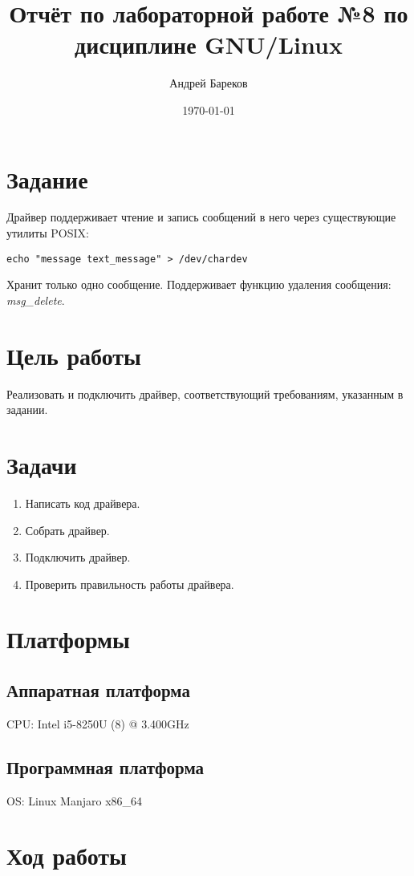 \documentclass[a4paper,11pt]{article}
\title{Отчёт по лабораторной работе №8 по дисциплине GNU/Linux}
\author{Андрей Бареков}
\date{\today}
\begin{document}
\maketitle
\newpage
\lstset{style=mycode}

\section{Задание}
  Драйвер поддерживает чтение и запись сообщений в него через существующие утилиты POSIX:
    \begin{lstlisting}
echo "message text_message" > /dev/chardev
    \end{lstlisting}
  Хранит только одно сообщение. Поддерживает функцию удаления сообщения: \textit{msg\_delete}.

\section{Цель работы}
  Реализовать и подключить драйвер, соответствующий требованиям, указанным в задании.

\section{Задачи}
  \begin{enumerate}
    \item Написать код драйвера.
    \item Собрать драйвер.
    \item Подключить драйвер.
    \item Проверить правильность работы драйвера.
  \end{enumerate}

\section{Платформы}
  \subsection{Аппаратная платформа}
    CPU: Intel i5-8250U (8) @ 3.400GHz

  \subsection{Программная платформа}
    OS: Linux Manjaro x86\_64

\newpage
\section{Ход работы}
\end{document}
